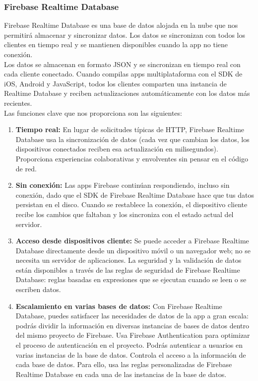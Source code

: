 \subsubsection{Firebase Realtime Database}
Firebase Realtime Database es una base de datos alojada en la nube que nos permitirá almacenar y sincronizar datos. Los datos se sincronizan con todos los clientes en tiempo real y se mantienen disponibles cuando la app no tiene conexión.
\\

Los datos se almacenan en formato JSON y se sincronizan en tiempo real con cada cliente conectado. Cuando compilas apps multiplataforma con el SDK de iOS, Android y JavaScript, todos los clientes comparten una instancia de Realtime Database y reciben actualizaciones automáticamente con los datos más recientes.
\\

Las funciones clave que nos proporciona son las siguientes:

\begin{enumerate}

\item \textbf{Tiempo real:}
En lugar de solicitudes típicas de HTTP, Firebase Realtime Database usa la sincronización de datos (cada vez que cambian los datos, los dispositivos conectados reciben esa actualización en milisegundos). Proporciona experiencias colaborativas y envolventes sin pensar en el código de red.
\item \textbf{Sin conexión:}
Las apps Firebase continúan respondiendo, incluso sin conexión, dado que el SDK de Firebase Realtime Database hace que tus datos persistan en el disco. Cuando se restablece la conexión, el dispositivo cliente recibe los cambios que faltaban y los sincroniza con el estado actual del servidor.
\item \textbf{Acceso desde dispositivos cliente:}
Se puede acceder a Firebase Realtime Database directamente desde un dispositivo móvil o un navegador web; no se necesita un servidor de aplicaciones. La seguridad y la validación de datos están disponibles a través de las reglas de seguridad de Firebase Realtime Database: reglas basadas en expresiones que se ejecutan cuando se leen o se escriben datos.
\item \textbf{Escalamiento en varias bases de datos:}
Con Firebase Realtime Database, puedes satisfacer las necesidades de datos de la app a gran escala: podrás dividir la información en diversas instancias de bases de datos dentro del mismo proyecto de Firebase. Usa Firebase Authentication para optimizar el proceso de autenticación en el proyecto. Podrás autenticar a usuarios en varias instancias de la base de datos. Controla el acceso a la información de cada base de datos. Para ello, usa las reglas personalizadas de Firebase Realtime Database en cada una de las instancias de la base de datos.

\end{enumerate}

